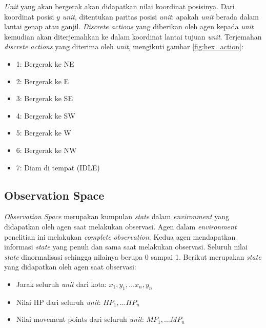 \emph{Unit} yang akan bergerak akan didapatkan nilai koordinat posisinya.
Dari koordinat posisi $y$ \emph{unit}, ditentukan paritas posisi \emph{unit}: apakah \emph{unit} berada dalam lantai genap atau ganjil.
\emph{Discrete actions} yang diberikan oleh agen kepada \emph{unit} kemudian akan diterjemahkan ke dalam koordinat lantai tujuan \emph{unit}.
Terjemahan \emph{discrete actions} yang diterima oleh \emph{unit}, mengikuti gambar \ref{fig:hex_action}:

\begin{itemize}
  \item 1: Bergerak ke NE
  \item 2: Bergerak ke E
  \item 3: Bergerak ke SE
  \item 4: Bergerak ke SW
  \item 5: Bergerak ke W
  \item 6: Bergerak ke NW
  \item 7: Diam di tempat (IDLE)
\end{itemize}

\subsection{Observation Space}
\emph{Observation Space} merupakan kumpulan \emph{state} dalam \emph{environment} yang didapatkan oleh agen saat melakukan observasi.
Agen dalam \emph{environment} penelitian ini melakukan \emph{complete observation}. 
Kedua agen mendapatkan informasi \emph{state} yang penuh dan sama saat melakukan observasi.
Seluruh nilai \emph{state} dinormalisasi sehingga nilainya berupa 0 sampai 1.
Berikut merupakan \emph{state} yang didapatkan oleh agen saat observasi:
\begin{itemize}
  \item Jarak seluruh \emph{unit} dari kota: $x_{1}, y_{1}, \dots x_{n}, y_{n}$
  \item Nilai HP dari seluruh \emph{unit}: $HP_{1}, \dots HP_{n}$
  \item Nilai movement points dari seluruh \emph{unit}: $MP_{1}, \dots MP_{n}$
\end{itemize}

